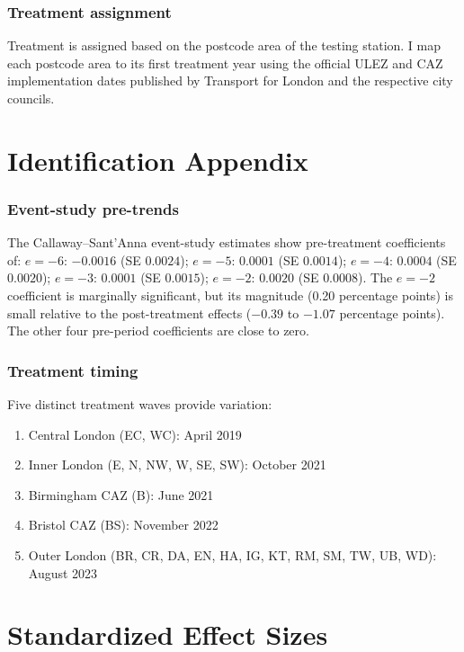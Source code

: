 \documentclass[12pt]{article}
\begin{document}
\subsubsection*{Treatment assignment} Treatment is assigned based on the postcode area of the testing station. I map each postcode area to its first treatment year using the official ULEZ and CAZ implementation dates published by Transport for London and the respective city councils.

\section{Identification Appendix}

\subsubsection*{Event-study pre-trends} The Callaway--Sant'Anna event-study estimates show pre-treatment coefficients of: $e=-6$: $-0.0016$ (SE $0.0024$); $e=-5$: $0.0001$ (SE $0.0014$); $e=-4$: $0.0004$ (SE $0.0020$); $e=-3$: $0.0001$ (SE $0.0015$); $e=-2$: $0.0020$ (SE $0.0008$). The $e=-2$ coefficient is marginally significant, but its magnitude (0.20 percentage points) is small relative to the post-treatment effects ($-0.39$ to $-1.07$ percentage points). The other four pre-period coefficients are close to zero.

\subsubsection*{Treatment timing} Five distinct treatment waves provide variation:
\begin{enumerate}
  \item Central London (EC, WC): April 2019
  \item Inner London (E, N, NW, W, SE, SW): October 2021
  \item Birmingham CAZ (B): June 2021
  \item Bristol CAZ (BS): November 2022
  \item Outer London (BR, CR, DA, EN, HA, IG, KT, RM, SM, TW, UB, WD): August 2023
\end{enumerate}

\section{Standardized Effect Sizes}
\label{sec:sde}


\end{document}
